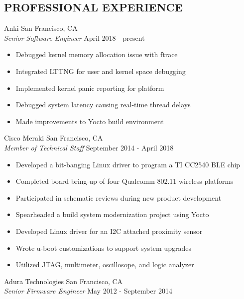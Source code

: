 \documentclass[line]{res}
\begin{document}
\begin{resume}
\section{PROFESSIONAL EXPERIENCE}
    \vspace{1mm}
    Anki  \hfill San Francisco, CA\\
    {\sl Senior Software Engineer} \hfill April  2018 - present
    \vspace{1mm}
    \begin{itemize}
        \item Debugged kernel memory allocation issue with ftrace  
        \item Integrated LTTNG for user and kernel space debugging  
        \item Implemented kernel panic reporting for platform
        \item Debugged system latency causing real-time thread delays  
        \item Made improvements to Yocto build environment  
    \end{itemize}
    \vspace{1mm}
    Cisco Meraki  \hfill San Francisco, CA\\
    {\sl Member of Technical Staff} \hfill September  2014 - April 2018
    \vspace{1mm}
    \begin{itemize}
        \item Developed a bit-banging Linux driver to program a TI CC2540 BLE chip
        \item Completed board bring-up of four Qualcomm 802.11 wireless platforms
        \item Participated in schematic reviews during new product development 
        \item Spearheaded a build system modernization project using Yocto
        \item Developed Linux driver for an I2C attached proximity sensor
        \item Wrote u-boot customizations to support system upgrades  
        \item Utilized JTAG, multimeter, oscillosope, and logic analyzer
    \end{itemize}
    \vspace{1mm}
    Adura Technologies  \hfill San Francisco, CA\\
    {\sl Senior Firmware Engineer} \hfill May  2012 - September 2014
    \vspace{1mm}
    \begin{itemize}

\end{itemize}
\end{resume}
\end{document}
